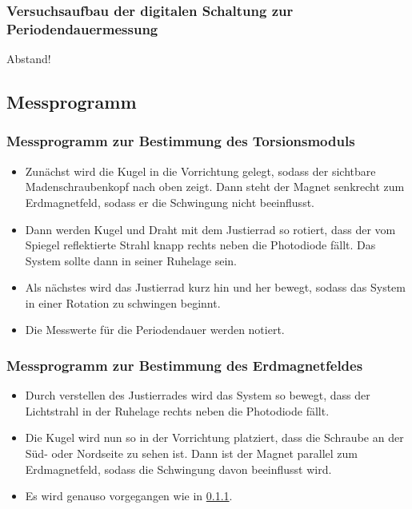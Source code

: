 \subsubsection{Versuchsaufbau der digitalen Schaltung zur Periodendauermessung}
Abstand!

\subsection{Messprogramm}

\subsubsection{Messprogramm zur Bestimmung des Torsionsmoduls}
\label{sec:MessTorsion}

\begin{itemize}

  \item Zunächst wird die Kugel in die Vorrichtung gelegt, sodass der
  sichtbare Madenschraubenkopf nach oben zeigt. Dann steht der Magnet
  senkrecht zum Erdmagnetfeld, sodass er die Schwingung nicht beeinflusst.

  \item Dann werden Kugel und Draht mit dem Justierrad so rotiert,
  dass der vom Spiegel reflektierte Strahl knapp rechts neben die Photodiode
  fällt. Das System sollte dann in seiner Ruhelage sein.

  \item Als nächstes wird das Justierrad kurz hin und her bewegt, sodass
  das System in einer Rotation zu schwingen beginnt.

  \item Die Messwerte für die Periodendauer werden notiert.

\end{itemize}

\subsubsection{Messprogramm zur Bestimmung des Erdmagnetfeldes}

\begin{itemize}

  \item Durch verstellen des Justierrades wird das System so bewegt,
  dass der Lichtstrahl in der Ruhelage rechts neben die Photodiode fällt.

  \item Die Kugel wird nun so in der Vorrichtung platziert, dass die Schraube
  an der Süd- oder Nordseite zu sehen ist. Dann ist der Magnet parallel zum
  Erdmagnetfeld, sodass die Schwingung davon beeinflusst wird.

  \item Es wird genauso vorgegangen wie in \ref{sec:MessTorsion}.

\end{itemize}

